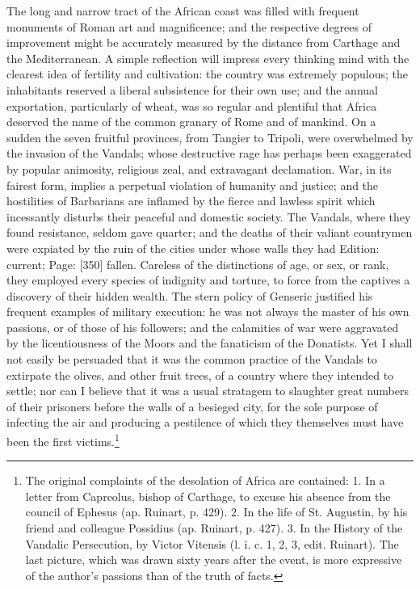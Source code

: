 The long and narrow tract of the African coast was filled with frequent monuments of Roman art and magnificence; and the respective degrees of improvement might be accurately measured by the distance from Carthage and the Mediterranean. A simple reflection will impress every thinking mind with the clearest idea of fertility and cultivation: the country was extremely populous; the inhabitants reserved a liberal subsistence for their own use; and the annual exportation, particularly of wheat, was so regular and plentiful that Africa deserved the name of the common granary of Rome and of mankind. On a sudden the seven fruitful provinces, from Tangier to Tripoli, were overwhelmed by the invasion of the Vandals; whose destructive rage has perhaps been exaggerated by popular animosity, religious zeal, and extravagant declamation. War, in its fairest form, implies a perpetual violation of humanity and justice; and the hostilities of Barbarians are inflamed by the fierce and lawless spirit which incessantly disturbs their peaceful and domestic society. The Vandals, where they found resistance, seldom gave quarter; and the deaths of their valiant countrymen were expiated by the ruin of the cities under whose walls they had Edition: current; Page: [350] fallen. Careless of the distinctions of age, or sex, or rank, they employed every species of indignity and torture, to force from the captives a discovery of their hidden wealth. The stern policy of Genseric justified his frequent examples of military execution: he was not always the master of his own passions, or of those of his followers; and the calamities of war were aggravated by the licentiousness of the Moors and the fanaticism of the Donatists. Yet I shall not easily be persuaded that it was the common practice of the Vandals to extirpate the olives, and other fruit trees, of a country where they intended to settle; nor can I believe that it was a usual stratagem to slaughter great numbers of their prisoners before the walls of a besieged city, for the sole purpose of infecting the air and producing a pestilence of which they themselves must have been the first victims.\footnote{The original complaints of the desolation of Africa are contained: 1. In a letter from Capreolus, bishop of Carthage, to excuse his absence from the council of Ephesus (ap. Ruinart, p. 429). 2. In the life of St. Augustin, by his friend and colleague Possidius (ap. Ruinart, p. 427). 3. In the History of the Vandalic Persecution, by Victor Vitensis (l. i. c. 1, 2, 3, edit. Ruinart). The last picture, which was drawn sixty years after the event, is more expressive of the author\texthebrew{}’s passions than of the truth of facts.}

